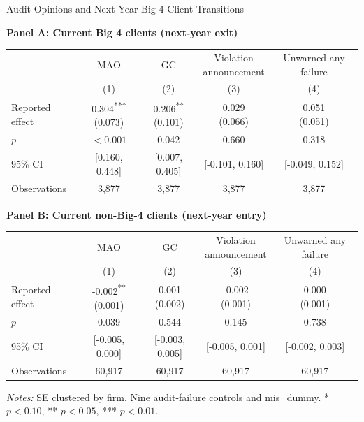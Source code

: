 \documentclass[10pt]{article}
\newcommand{\sym}[1]{\textsuperscript{#1}}
\begin{document}
\fontsize{10}{12}\selectfont
\setlength{\tabcolsep}{3pt}\renewcommand{\arraystretch}{1.15}
\begin{center}\large Audit Opinions and Next-Year Big 4 Client Transitions\end{center}
\medskip\textbf{Panel A: Current Big 4 clients (next-year exit)}\par\smallskip
\begin{tabular*}{\textwidth}{@{\extracolsep{\fill}}lcccc@{}}
\toprule
 & MAO & GC & \shortstack{Violation\\announcement} & Unwarned any failure \\
 & (1) & (2) & (3) & (4) \\
\midrule
Reported effect & \shortstack{0.304\sym{***}\\(0.073)} & \shortstack{0.206\sym{**}\\(0.101)} & \shortstack{0.029\\(0.066)} & \shortstack{0.051\\(0.051)} \\
$p$ & $<0.001$ & 0.042 & 0.660 & 0.318 \\
95\% CI & [0.160, 0.448] & [0.007, 0.405] & [-0.101, 0.160] & [-0.049, 0.152] \\
Observations & 3,877 & 3,877 & 3,877 & 3,877 \\
\bottomrule\end{tabular*}\par
\medskip\textbf{Panel B: Current non-Big-4 clients (next-year entry)}\par\smallskip
\begin{tabular*}{\textwidth}{@{\extracolsep{\fill}}lcccc@{}}
\toprule
 & MAO & GC & \shortstack{Violation\\announcement} & Unwarned any failure \\
 & (1) & (2) & (3) & (4) \\
\midrule
Reported effect & \shortstack{-0.002\sym{**}\\(0.001)} & \shortstack{0.001\\(0.002)} & \shortstack{-0.002\\(0.001)} & \shortstack{0.000\\(0.001)} \\
$p$ & 0.039 & 0.544 & 0.145 & 0.738 \\
95\% CI & [-0.005, 0.000] & [-0.003, 0.005] & [-0.005, 0.001] & [-0.002, 0.003] \\
Observations & 60,917 & 60,917 & 60,917 & 60,917 \\
\bottomrule\end{tabular*}\par
\medskip\fontsize{9}{11}\selectfont\textit{Notes:} SE clustered by firm. Nine audit-failure controls and mis\_dummy. * $p<0.10$, ** $p<0.05$, *** $p<0.01$.
\end{document}
